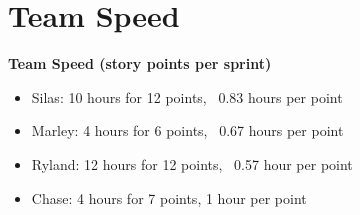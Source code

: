 \section{Team Speed}
\textbf{Team Speed (story points per sprint)}
\begin{itemize}
    \item Silas: 10 hours for 12 points, ~0.83 hours per point
    \item Marley: 4 hours for 6 points, ~0.67 hours per point
    \item Ryland: 12 hours for 12 points, ~0.57 hour per point
    \item Chase: 4 hours for 7 points, 1 hour per point
\end{itemize}
